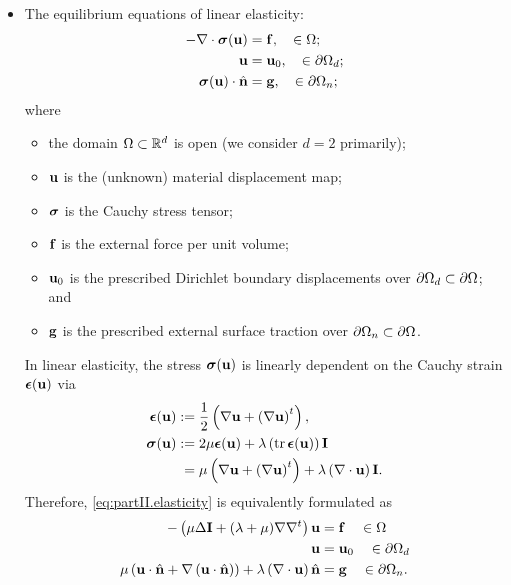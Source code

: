 \begin{itemize}
\item The equilibrium equations of linear elasticity:
\begin{subequations} \label{eq:partII.elasticity}
\begin{align}
-\nabla \cdot \boldsymbol{\sigma}(\mathbf{u}) & = \mathbf{f}, \quad \in \Omega; \\
\mathbf{u} & = \mathbf{u}_0, \quad \in \partial\Omega_d; \\
\boldsymbol{\sigma}(\mathbf{u}) \cdot \hat{\mathbf{n}} & = \mathbf{g}, \quad \in \partial\Omega_n;
\end{align}
\end{subequations}
where
\begin{itemize}
\item the domain $\Omega \subset \mathbb{R}^d$ is open (we consider $d = 2$ primarily);
\item $\mathbf{u}$ is the (unknown) material displacement map;
\item $\boldsymbol{\sigma}$ is the Cauchy stress tensor;
\item $\mathbf{f}$ is the external force per unit volume;
\item $\mathbf{u}_0$ is the prescribed Dirichlet boundary displacements over $\partial\Omega_d \subset \partial\Omega$; and
\item $\mathbf{g}$ is the prescribed external surface traction over $\partial\Omega_n \subset \partial\Omega$.
\end{itemize}
In linear elasticity, the stress $\boldsymbol{\sigma}(\mathbf{u})$ is linearly dependent on the Cauchy strain $\boldsymbol{\epsilon}(\mathbf{u})$ via
\begin{align*}
\boldsymbol{\epsilon}(\mathbf{u}) := {} & \frac{1}{2} \left( \nabla \mathbf{u} + \left( \nabla \mathbf{u} \right)^t \right), \\
\boldsymbol{\sigma}(\mathbf{u})   := {} & 2 \mu \boldsymbol{\epsilon}(\mathbf{u}) + \lambda \left( \operatorname{tr} \boldsymbol{\epsilon}(\mathbf{u}) \right) \mathbf{I} \\
                  = {} & \mu \left( \nabla \mathbf{u} + \left( \nabla \mathbf{u} \right)^t \right) + \lambda \left( \nabla \cdot \mathbf{u} \right) \mathbf{I}.
\end{align*}
Therefore, \eqref{eq:partII.elasticity} is equivalently formulated as
\begin{subequations} \label{eq:partII.LE}
\begin{align}
-\left( \mu \Delta \mathbf{I} + (\lambda + \mu) \nabla \nabla^t \right) \mathbf{u} & = \mathbf{f} \quad \in \Omega \label{eq:partII.LE.PDE} \\
\mathbf{u} & = \mathbf{u}_0 \quad \in \partial\Omega_d \label{eq:partII.LE.D} \\
\mu \left( \mathbf{u} \cdot \hat{\mathbf{n}} + \nabla \left( \mathbf{u} \cdot \hat{\mathbf{n}} \right) \right) + \lambda \left( \nabla \cdot \mathbf{u} \right) \hat{\mathbf{n}} & = \mathbf{g} \quad \in \partial\Omega_n \label{eq:partII.LE.N}.
\end{align}
\end{subequations}

\end{itemize}

